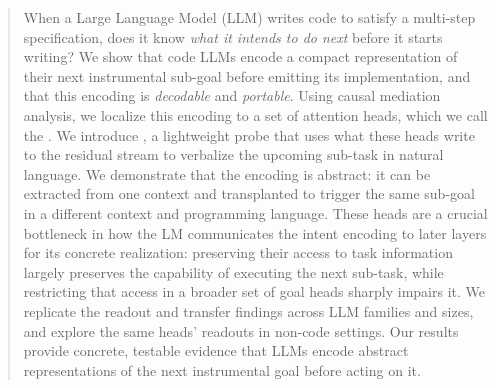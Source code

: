 \begin{abstract}
When a Large Language Model (LLM) writes code to satisfy a multi-step specification, does it know \emph{what it intends to do next} before it starts writing?  We show that code LLMs encode a compact representation of  their next instrumental sub-goal before emitting its implementation, and that this encoding is \emph{decodable} and \emph{portable}. Using causal mediation analysis, we localize this encoding to a set of attention heads, which we call the \goalheads. We introduce \goalscope, a lightweight probe that uses what these heads write to the  residual stream to verbalize the upcoming sub-task in natural language. We demonstrate that the encoding is abstract: it can be extracted from one context and transplanted to trigger the same sub-goal in a different context and programming language. These heads are a crucial bottleneck in how the LM communicates the intent encoding to later layers for its concrete realization: preserving their access to task information largely preserves the capability of executing the next sub-task, while restricting that access in a broader set of goal heads sharply impairs it. We replicate the readout and transfer findings across LLM families and sizes, and explore the same heads' readouts in non-code settings. Our results provide concrete, testable evidence that LLMs encode abstract representations of the next instrumental goal before acting on it.
\end{abstract}
